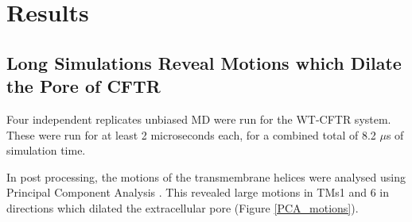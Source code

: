 \section{Results}

\subsection{Long Simulations Reveal Motions which Dilate the Pore of CFTR}
Four independent replicates unbiased MD were run for the WT-CFTR system. These were run for at least 2 microseconds each, for a combined total of 8.2 $\mu$s of simulation time. 

In post processing, the motions of the transmembrane helices were analysed using Principal Component Analysis \cite{pearson1901, hotelling1936}. This revealed large motions in TMs1 and 6 in directions which dilated the extracellular pore (Figure \ref{PCA_motions}).  

